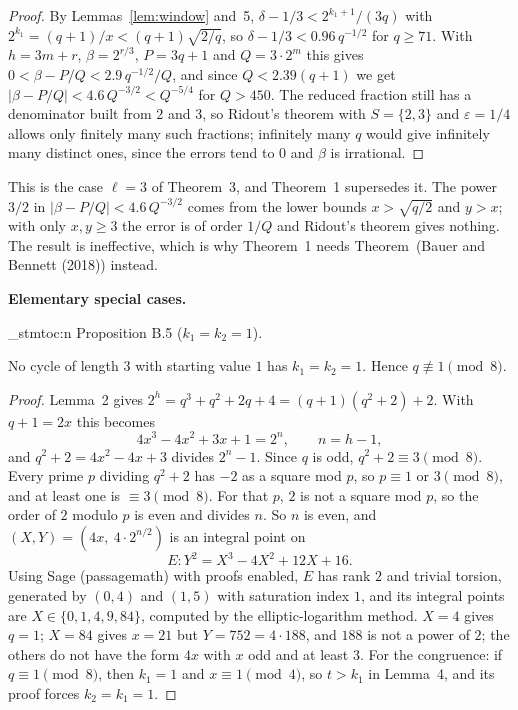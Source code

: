 \documentclass[11pt]{article}
\newenvironment{named}[1]{%
  \par\addvspace{\medskipamount}%
  \pagebreak[3]%
  \noindent{\bfseries #1}\space\ignorespaces
  \stmtoc{#1}%
}{\par\addvspace{\medskipamount}}
\newcommand{\topic}[1]{\par\noindent\textbf{#1}}
\newcommand{\stmtoc}[1]{ \qn_stmtoc:n {#1} }
\begin{document}
\begin{proof}
By Lemmas~\ref{lem:window} and~5, $\delta - 1/3 < 2^{k_1+1}/(3q)$ with $2^{k_1} = (q+1)/x < (q+1)\sqrt{2/q}$, so $\delta - 1/3 < 0.96\, q^{-1/2}$ for $q \ge 71$.
With $h = 3m + r$, $\beta = 2^{r/3}$, $P = 3q + 1$ and $Q = 3 \cdot 2^m$ this gives $0 < \beta - P/Q < 2.9\, q^{-1/2}/Q$, and since $Q < 2.39(q+1)$ we get $|\beta - P/Q| < 4.6\, Q^{-3/2} < Q^{-5/4}$ for $Q > 450$.
The reduced fraction still has a denominator built from $2$ and $3$, so Ridout's theorem with $S = \{2, 3\}$ and $\varepsilon = 1/4$ allows only finitely many such fractions; infinitely many $q$ would give infinitely many distinct ones, since the errors tend to $0$ and $\beta$ is irrational.
\end{proof}

This is the case $\ell = 3$ of Theorem~3, and Theorem~1 supersedes it.
The power $3/2$ in $|\beta - P/Q| < 4.6\, Q^{-3/2}$ comes from the lower bounds $x > \sqrt{q/2}$ and $y > x$; with only $x, y \ge 3$ the error is of order $1/Q$ and Ridout's theorem gives nothing.
The result is ineffective, which is why Theorem~1 needs Theorem~(Bauer and Bennett (2018)) instead.

\topic{Elementary special cases.}
\begin{named}{Proposition B.5 ($k_1 = k_2 = 1$).}
No cycle of length $3$ with starting value $1$ has $k_1 = k_2 = 1$.
Hence $q \not\equiv 1 \pmod{8}$.
\end{named}

\begin{proof}
Lemma~2 gives $2^h = q^3 + q^2 + 2q + 4 = (q+1)(q^2 + 2) + 2$.
With $q + 1 = 2x$ this becomes
\[
4x^3 - 4x^2 + 3x + 1 = 2^n, \qquad n = h - 1,
\]
and $q^2 + 2 = 4x^2 - 4x + 3$ divides $2^n - 1$.
Since $q$ is odd, $q^2 + 2 \equiv 3 \pmod{8}$.
Every prime $p$ dividing $q^2 + 2$ has $-2$ as a square mod $p$, so $p \equiv 1$ or $3 \pmod{8}$, and at least one is $\equiv 3 \pmod{8}$.
For that $p$, $2$ is not a square mod $p$, so the order of $2$ modulo $p$ is even and divides $n$.
So $n$ is even, and $(X, Y) = (4x,\ 4 \cdot 2^{n/2})$ is an integral point on
\[
E \colon Y^2 = X^3 - 4X^2 + 12X + 16.
\]
Using Sage (passagemath) with proofs enabled, $E$ has rank $2$ and trivial torsion, generated by $(0, 4)$ and $(1, 5)$ with saturation index $1$, and its integral points are $X \in \{0, 1, 4, 9, 84\}$, computed by the elliptic-logarithm method. $X = 4$ gives $q = 1$; $X = 84$ gives $x = 21$ but $Y = 752 = 4 \cdot 188$, and $188$ is not a power of $2$; the others do not have the form $4x$ with $x$ odd and at least $3$.
For the congruence: if $q \equiv 1 \pmod{8}$, then $k_1 = 1$ and $x \equiv 1 \pmod{4}$, so $t > k_1$ in Lemma~4, and its proof forces $k_2 = k_1 = 1$.
\end{proof}
\end{document}
